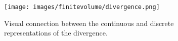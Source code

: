 \begin{figure}[ht]
    \centering
    \texttt{[image: images/finitevolume/divergence.png]}
    \caption{Visual connection between the continuous and discrete representations of the divergence.}
    \label{fig:divergence}
\end{figure}
